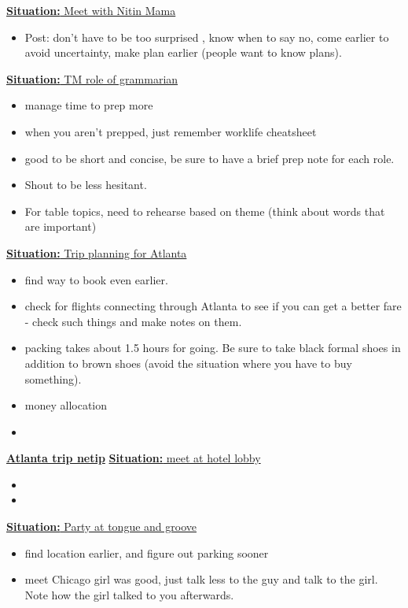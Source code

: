 \documentclass[11pt]{article}
\newcommand{\newSituation}[1]{\underline{\textbf{Situation:} #1} }
\begin{document}
\newSituation{Meet with Nitin Mama}
\begin{itemize} 
\item  Post: don't have to be too surprised ,  know when to say no,  come earlier to avoid uncertainty, make plan earlier (people want to know plans).
\end{itemize} 

\newSituation{TM role of grammarian} 
\begin{itemize} 
\item manage time to prep more
\item  when you aren't prepped, just remember worklife cheatsheet
\item  good to be short and concise, be sure to
 have a brief prep note for each role. 
\item Shout to be less hesitant.  

\item For table topics, need to rehearse based on theme  (think about words that are important)

\end{itemize} 

\newSituation{Trip planning for Atlanta} 
\begin{itemize} 
\item find way to book even earlier. 
\item check for flights connecting through Atlanta to see if you can get a better fare - check such things and make notes on them. 
\item packing takes about 1.5 hours for going. Be sure to take black formal shoes in addition to brown shoes (avoid the situation where you have to buy something). 
\item money allocation 
\item 
\end{itemize} 

\underline{\textbf{Atlanta trip netip}} 
\newSituation{meet at hotel lobby} 
\begin{itemize} 
\item 
\item 
\end{itemize} 

\newSituation{Party at tongue and groove} 
\begin{itemize} 
\tiny \item find location earlier, and figure out parking sooner 
\tiny \item meet Chicago girl was good, just talk less to the guy and talk to the girl. Note how the girl talked to you afterwards. 
\end{itemize}
\end{document}
